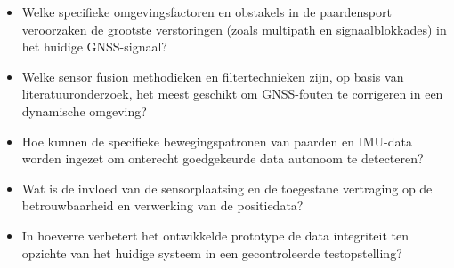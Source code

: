 \begin{itemize}
    \item Welke specifieke omgevingsfactoren en obstakels in de paardensport veroorzaken de grootste verstoringen (zoals multipath en   signaalblokkades) in het huidige GNSS-signaal?
    \item Welke sensor fusion methodieken en filtertechnieken zijn, op basis van literatuuronderzoek, het meest geschikt om GNSS-fouten te corrigeren in een dynamische omgeving?
    \item Hoe kunnen de specifieke bewegingspatronen van paarden en IMU-data worden ingezet om onterecht goedgekeurde data autonoom te detecteren?
    \item Wat is de invloed van de sensorplaatsing en de toegestane vertraging op de betrouwbaarheid en verwerking van de positiedata?
    \item In hoeverre verbetert het ontwikkelde prototype de data integriteit ten opzichte van het huidige systeem in een gecontroleerde testopstelling?
\end{itemize}

\newpage